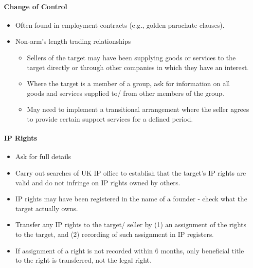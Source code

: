 \documentclass[
]{article}
\providecommand{\tightlist}{%
  \setlength{\itemsep}{0pt}\setlength{\parskip}{0pt}}
\begin{document}
\hypertarget{change-of-control}{%
\paragraph{Change of Control}\label{change-of-control}}

\begin{itemize}
\tightlist
\item
  Often found in employment contracts (e.g., golden parachute clauses).
\item
  Non-arm's length trading relationships

  \begin{itemize}
  \tightlist
  \item
    Sellers of the target may have been supplying goods or services to
    the target directly or through other companies in which they have an
    interest.
  \item
    Where the target is a member of a group, ask for information on all
    goods and services supplied to/ from other members of the group.
  \item
    May need to implement a transitional arrangement where the seller
    agrees to provide certain support services for a defined period.
  \end{itemize}
\end{itemize}

\hypertarget{ip-rights}{%
\paragraph{IP Rights}\label{ip-rights}}

\begin{itemize}
\tightlist
\item
  Ask for full details
\item
  Carry out searches of UK IP office to establish that the target's IP
  rights are valid and do not infringe on IP rights owned by others.
\item
  IP rights may have been registered in the name of a founder - check
  what the target actually owns.
\item
  Transfer any IP rights to the target/ seller by (1) an assignment of
  the rights to the target, and (2) recording of such assignment in IP
  registers.
\item
  If assignment of a right is not recorded within 6 months, only
  beneficial title to the right is transferred, not the legal right.
\end{itemize}
\end{document}
